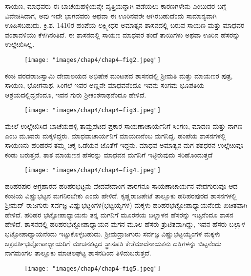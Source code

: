 ಸಾಯಣ, ಮಾಧವರು ಈ ಬಾಚೆಯಹಳ್ಳಿಯನ್ನೇ ವೃತ್ತಿಯನ್ನಾಗಿ ಪಡೆಯಲು ಕಾರಣಗಳೇನು ಎಂಬುದರ ಬಗ್ಗೆ ವಿವೇಚಿಸಿದಾಗ, ಅವು ಇದೇ ಭಾಗದವರು ಅಥವಾ ಈ ಊರಿನವರೇ ಆಗಿರಬಹುದೆಂದು ಸಾಮಾನ್ಯವಾಗಿ ಊಹಿಸಬಹುದು. ಕ್ರಿ.ಶ. 1410ರ ಹಂಪೆಯ ಲಕ್ಷ್ಮೀಧರ ಅಮಾತ್ಯನ ಶಾಸನದಲ್ಲಿ ಬರುವ ಸಾಯಣ ಮತ್ತು ಮಾಧವರ ವಂಶಾವಳಿಯು ಕೆಳಗಿನಂತಿದೆ. ಈ ಶಾಸನದಲ್ಲಿ ಸಾಯಣ ಮಾಧವರ ತಂದೆ ತಾಯಿಗಳು ಅಥವಾ ಊರಿನ ಹೆಸರನ್ನು ಉಲ್ಲೇಖಿಸಿಲ್ಲ.

\begin{figure}[!h]
\texttt{[image: "images/chap4/chap4–fig2.jpeg"]}
\end{figure}

ಕಂಚಿ ವರದರಾಜಸ್ವಾಮಿ ದೇವಾಲಯದ ಅಭಿಷೇಕ ಮಂಟಪದ ಶಾಸನದಲ್ಲಿ ಶ‍್ರೀಮತಿ ಮತ್ತು ಮಾಯಣರ ಪುತ್ರ, ಸಾಯಣ, ಭೋಗನಾಥ, ಸಿಂಗಲೆ ಇವರ ಅಣ್ಣನೇ ಮಾಧವನೆಂದೂ ಇವನು ಸಂಗಮ ಭೂಪತಿಯ ಆಶ್ರಯದಲ್ಲಿದ್ದನೆಂದೂ, ಇವನ ಗುರು ಶ‍್ರೀಕಂಠನಾಥನೆಂದೂ ಹೇಳಿದೆ.

\begin{figure}[!h]
\texttt{[image: "images/chap4/chap4–fig3.jpeg"]}
\end{figure}

ಮೇಲೆ ಉಲ್ಲೇಖಿಸಿದ ಬಾಚೆಯಹಳ್ಳಿ ತಾಮ್ರಪಟದ ಪ್ರಕಾರ ಸಾಯಣಾಚಾರ್ಯನಿಗೆ ಸಿಂಗಣ, ಮಾದಣ ಮತ್ತು ನಾಗಣ ಎಂಬ ಮೂವರು ಮಕ್ಕಳಿದ್ದರು. ಮಾಧವಾಚಾರ್ಯನಿಗೆ ಮಾಯಣನೆಂಬ ಮಗನಿದ್ದ. ಹಂಪೆಯ ಶಾಸನಗಳಲ್ಲಿ ಸಾಯಣನು ಹರಿಹರನ ತಮ್ಮ ಚಿಕ್ಕ ಒಡೆಯನ ಜೊತೆಗೆ ಇದ್ದನು. ಮಾಧವ ಅಮಾತ್ಯನ ಮಗ ಶಶಧರನ ಉಲ್ಲೇಖವೂ ಕಂಡು ಬರುತ್ತದೆ. ತಾತ ಮಾಯಣನ ಹೆಸರನ್ನು ಮಾಧವನ ಮಗನಿಗೆ ಇಟ್ಟಿರುವುದು ಸರಿಹೊಂದುತ್ತದೆ

\begin{figure}[!h]
\texttt{[image: "images/chap4/chap4–fig4.jpeg"]}
\end{figure}

ಹರಿಹರಪುರ ಅಗ್ರಹಾರದ ಹರಿಹರಭಟ್ಟನು ವೇದವೇದಾಂಗ ಪಾರಗನೂ ಸಾಯಣಾಚಾರ್ಯನ ವೇದಗುರುವೂ ಆದ ಕಂಚಿಯ ವಿಷ್ಣುಭಟ್ಟನ ಮಗನಿರಬೇಕು ಎಂದು ಹೇಳಿದೆ. ಕೃಷ್ಣರಾಜಪೇಟೆ ತಾಲ್ಲೂಕು ಹರಿಹರಪುರದ ಶಾಸನಗಳಲ್ಲಿ ಶ‍್ರೀಮದ್​ ರಾಜಗುರು ಸರ್ವಜ್ಞ ವಿಷ್ಣುಭಟ್ಟಂಗಳ(ಭಟ್ಟಯ್ಯಗಳ) ಮಕ್ಕಳು ಹರಿಹರಭಟ್ಟೋಪಾಧ್ಯಾಯನೆಂದು ಖಚಿತವಾಗಿ ಹೇಳಿದೆ. ಹರಿಹರ ಭಟ್ಟೋಪಾಧ್ಯಾಯನು ತನ್ನ ಮಗನಿಗೆ ಮೂರನೆಯ ಬಲ್ಲಾಳನ ಹೆಸರನ್ನು ಇಟ್ಟನೆಂದೂ ಶಾಸನ ಹೇಳಿದೆ. ಶಾಸನದಲ್ಲಿ ಹರಿಹರಭಟ್ಟೋಪಾಧ್ಯಾಯನ ಮಗನ ಮೂಲ ಹೆಸರು ತ್ರುಟಿತವಾಗಿದ್ದು, ಇವನ ಹೆಸರು ಬಲ್ಲಾಳ ಭಟ್ಟೋಪಾಧ್ಯಾಯನೆಂದು ಇಟ್ಟುಕೊಳ್ಳಬಹುದು. ಶ‍್ರೀಮದ್ರಾಜಗುರು ಸರ್ವಜ್ಞ ವಿಷ್ಣುಭಟ್ಟಯ್ಯಂಗಳ ಮಕ್ಕಳು ಚಕ್ರವರ್ತಿಭಟ್ಟೋಪಾಧ್ಯಾಯರಿಗೆ ಮಾಚನಕಟ್ಟದ ಸ್ಥಾನಪತಿ ಕೇತೆಮಾದೆನಾಯಕನು ದತ್ತಿಗಳನ್ನು ಬಿಟ್ಟನೆಂದು ನಾಗಮಂಗಲ ತಾಲ್ಲೂಕು ಮಾಚಲಘಟ್ಟ ಶಾಸನದಿಂದ ತಿಳಿದುಬರುತ್ತದೆ.

\begin{figure}[!h]
\texttt{[image: "images/chap4/chap4–fig5.jpeg"]}
\end{figure}

